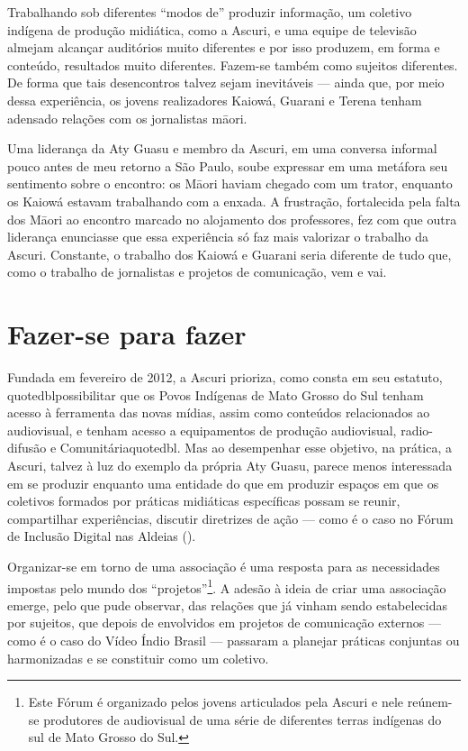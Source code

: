 Trabalhando sob diferentes ``modos de'' produzir informação, um coletivo
indígena de produção midiática, como a Ascuri, e uma equipe de
televisão almejam alcançar auditórios muito diferentes e por isso
produzem, em forma e conteúdo, resultados muito diferentes. Fazem-se
também como sujeitos diferentes. De forma que tais desencontros talvez
sejam inevitáveis — ainda que, por meio dessa experiência, os jovens
realizadores Kaiowá, Guarani e Terena tenham adensado relações com os
jornalistas m\=aori.

Uma liderança da Aty Guasu e membro da Ascuri, em uma conversa informal
pouco antes de meu retorno a São Paulo, soube expressar em uma metáfora
seu sentimento sobre o encontro: os M\=aori haviam chegado com um
trator, enquanto os Kaiowá estavam trabalhando com a enxada. A
frustração, fortalecida pela falta dos M\=aori ao encontro marcado no
alojamento dos professores, fez com que outra liderança enunciasse que
essa experiência só faz mais valorizar o trabalho da Ascuri. Constante,
o trabalho dos Kaiowá e Guarani seria diferente de tudo que, como o
trabalho de jornalistas e projetos de comunicação, vem e vai.

\section{Fazer-se para fazer}

Fundada em fevereiro de 2012, a Ascuri prioriza, como consta em seu
estatuto, {quotedbl}possibilitar que os Povos Indígenas de Mato
Grosso do Sul tenham acesso à ferramenta das novas mídias, assim como
conteúdos relacionados ao audiovisual, e tenham acesso a equipamentos
de produção audiovisual, radio-difusão e  Comunitária{quotedbl}.
Mas ao desempenhar esse objetivo, na prática, a Ascuri, talvez à luz do
exemplo da própria Aty Guasu, parece menos interessada em se produzir
enquanto uma entidade do que em produzir espaços em que os coletivos
formados por práticas midiáticas específicas possam se reunir,
compartilhar experiências, discutir diretrizes de ação — como é o caso
no Fórum de Inclusão Digital nas Aldeias ().

Organizar-se em torno de uma associação é uma resposta para as
necessidades impostas pelo mundo dos ``projetos''\footnote{Este Fórum é
organizado pelos jovens articulados pela Ascuri e nele reúnem-se
produtores de audiovisual de uma série de diferentes terras indígenas
do sul de Mato Grosso do Sul. }. A adesão à ideia de criar uma
associação emerge, pelo que pude observar, das relações que já vinham
sendo estabelecidas por sujeitos, que depois de envolvidos em projetos
de comunicação externos — como é o caso do Vídeo Índio Brasil —
passaram a planejar práticas conjuntas ou harmonizadas e se constituir
como um coletivo.


